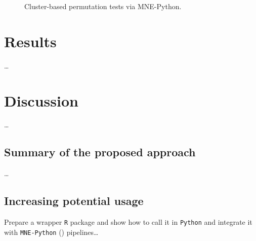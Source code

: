 \documentclass[
  doc,
  floatsintext,
  longtable,
  a4paper,
  nolmodern,
  notxfonts,
  notimes,
  colorlinks=true,linkcolor=blue,citecolor=blue,urlcolor=blue]{apa7}
\begin{document}
\begin{figure}[!htb]

\caption{\label{fig-mne-cluster}Cluster-based permutation tests via
MNE-Python.}


\end{figure}%

\newpage

\section{Results}\label{results}

\ldots{}

\newpage

\section{Discussion}\label{discussion}

\ldots{}

\subsection{Summary of the proposed
approach}\label{summary-of-the-proposed-approach}

\ldots{}

\subsection{Increasing potential
usage}\label{increasing-potential-usage}

Prepare a wrapper \texttt{R} package and show how to call it in
\texttt{Python} and integrate it with \texttt{MNE-Python}
() pipelines\ldots{}
\end{document}

